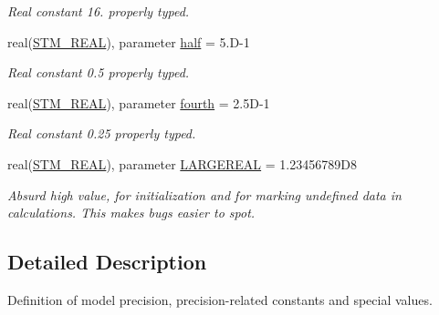 \begin{CompactItemize}
\begin{CompactList}\small\item\em Real constant 16. properly typed. \item\end{CompactList}\item 
\hypertarget{a00038_f9ecdeb8d63b6a98a944bdd58d95b365}{
real(\hyperlink{a00038_9b1e7e9d7f36de86830360566a430b08}{STM\_\-REAL}), parameter \hyperlink{a00038_f9ecdeb8d63b6a98a944bdd58d95b365}{half} = 5.D-1}
\label{a00038_f9ecdeb8d63b6a98a944bdd58d95b365}

\begin{CompactList}\small\item\em Real constant 0.5 properly typed. \item\end{CompactList}\item 
\hypertarget{a00038_86acc76f30613d29790a7b9ad761515b}{
real(\hyperlink{a00038_9b1e7e9d7f36de86830360566a430b08}{STM\_\-REAL}), parameter \hyperlink{a00038_86acc76f30613d29790a7b9ad761515b}{fourth} = 2.5D-1}
\label{a00038_86acc76f30613d29790a7b9ad761515b}

\begin{CompactList}\small\item\em Real constant 0.25 properly typed. \item\end{CompactList}\item 
\hypertarget{a00038_70a79cdf0c9a12886548434860e3f18e}{
real(\hyperlink{a00038_9b1e7e9d7f36de86830360566a430b08}{STM\_\-REAL}), parameter \hyperlink{a00038_70a79cdf0c9a12886548434860e3f18e}{LARGEREAL} = 1.23456789D8}
\label{a00038_70a79cdf0c9a12886548434860e3f18e}

\begin{CompactList}\small\item\em Absurd high value, for initialization and for marking undefined data in calculations. This makes bugs easier to spot. \item\end{CompactList}\end{CompactItemize}


\subsection{Detailed Description}
Definition of model precision, precision-related constants and special values. 

